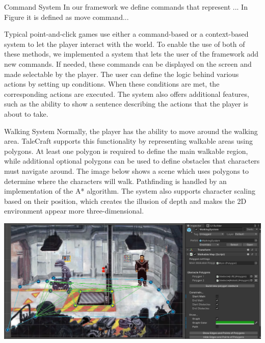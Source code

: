 \documentclass[portrait,a0paper,fontscale=0.35]{baposter}
\begin{document}
\begin{poster}
\begin{posterbox}[column=0, span=1, name=cs, below=architecture]{Command System}
In our framework we define commands that represent ...
In Figure it is defined as move command...


Typical point-and-click games use either a command-based or a context-based system to let the player interact with the world. To enable the use of both of these methods, we implemented a system that lets the user of the framework add new commands. If needed, these commands can be displayed on the screen and made selectable by the player. The user can define the logic behind various actions by setting up conditions. When these conditions are met, the corresponding actions are executed.  The system also offers additional features, such as the ability to show a sentence describing the actions that the player is about to take.


\end{posterbox}

\begin{posterbox}[column=0, span=1, name=ws, below=cs]{Walking System}
Normally, the player has the ability to move around the walking area. TaleCraft supports this functionality by representing walkable areas using polygons. At least one polygon is required to define the main walkable region, while additional optional polygons can be used to define obstacles that characters must navigate around. The image below shows a scene which uses polygons to determine where the characters will walk. Pathfinding is handled by an implementation of the A* algorithm. The system also supports character scaling based on their position, which creates the illusion of depth and makes the 2D environment appear more three-dimensional. 

\begin{center}
\includegraphics[width=0.75\linewidth]{img/walkable_map3.png}
\end{center}
\end{posterbox}

%
%
%


\end{poster}
\end{document}
